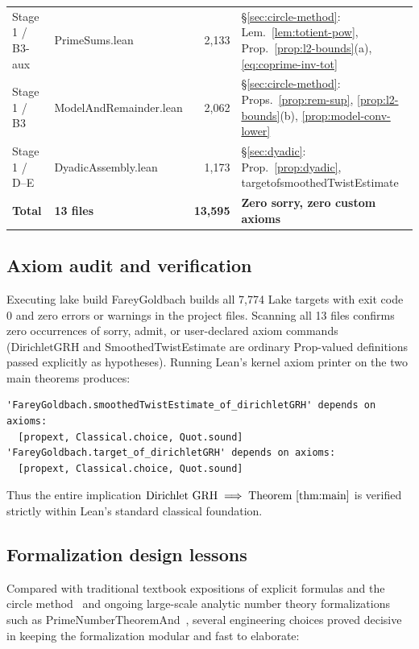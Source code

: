\documentclass[11pt,reqno]{amsart}
\numberwithin{equation}{section}
\theoremstyle{definition}
\newcommand{\1}{\mathbf{1}}
\newcommand{\lean}[1]{{\footnotesize\ttfamily\renewcommand{\_}{\textunderscore\allowbreak}#1}}
\newcommand{\GRH}{\textup{GRH}}
\begin{document}
\begin{table}[htbp]
{\begin{tabular}{@{}llrl@{}}
Stage 1 / B3-aux & \lean{PrimeSums.lean} & 2{,}133 & \S\ref{sec:circle-method}: Lem.~\ref{lem:totient-pow}, Prop.~\ref{prop:l2-bounds}(a), \eqref{eq:coprime-inv-tot} \\
Stage 1 / B3 & \lean{ModelAndRemainder.lean} & 2{,}062 & \S\ref{sec:circle-method}: Props.~\ref{prop:rem-sup}, \ref{prop:l2-bounds}(b), \ref{prop:model-conv-lower} \\
Stage 1 / D--E & \lean{DyadicAssembly.lean} & 1{,}173 & \S\ref{sec:dyadic}: Prop.~\ref{prop:dyadic}, \lean{target\_of\_smoothedTwistEstimate} \\
\midrule
\textbf{Total} & \textbf{13 files} & \textbf{13{,}595} & \textbf{Zero \lean{sorry}, zero custom axioms} \\
\bottomrule
\end{tabular}%
}
\end{table}

\subsection{Axiom audit and verification}

Executing \lean{lake build FareyGoldbach} builds all 7{,}774 Lake targets with exit code~$0$ and zero errors or warnings in the project files. Scanning all 13 files confirms zero occurrences of \lean{sorry}, \lean{admit}, or user-declared \lean{axiom} commands (\lean{DirichletGRH} and \lean{SmoothedTwistEstimate} are ordinary \lean{Prop}-valued definitions passed explicitly as hypotheses). Running Lean's kernel axiom printer on the two main theorems produces:
\begin{verbatim}
'FareyGoldbach.smoothedTwistEstimate_of_dirichletGRH' depends on axioms:
  [propext, Classical.choice, Quot.sound]
'FareyGoldbach.target_of_dirichletGRH' depends on axioms:
  [propext, Classical.choice, Quot.sound]
\end{verbatim}
Thus the entire implication $\text{Dirichlet \GRH{}} \implies \text{Theorem~\ref{thm:main}}$ is verified strictly within Lean's standard classical foundation.

\subsection{Formalization design lessons}

Compared with traditional textbook expositions of explicit formulas and the circle method~\cite{Davenport2000,IwaniecKowalski2004,MontgomeryVaughan2007} and ongoing large-scale analytic number theory formalizations such as \lean{PrimeNumberTheoremAnd}~\cite{PrimeNumberTheoremAnd}, several engineering choices proved decisive in keeping the formalization modular and fast to elaborate:
\end{document}
